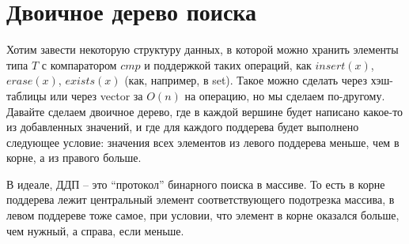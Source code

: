 \section{Двоичное дерево поиска}



Хотим завести некоторую структуру данных, в которой можно хранить элементы типа $T$ с компаратором $cmp$ и поддержкой таких операций, как $insert(x)$, $erase(x)$, $exists(x)$ (как, например, в set). Такое можно сделать через хэш-таблицы или через vector за $O(n)$ на операцию, но мы сделаем по-другому. 
Давайте сделаем двоичное дерево, где в каждой вершине будет написано какое-то из добавленных значений, и где для каждого поддерева будет выполнено следующее условие: значения всех элементов из левого поддерева меньше, чем в корне, а из правого больше. \\ 

\begin{center} 
\end{center}

В идеале, ДДП -- это ``протокол'' бинарного поиска в массиве. То есть в корне поддерева лежит центральный элемент соответствующего подотрезка массива, в левом поддереве тоже самое, при условии, что элемент в корне оказался больше, чем нужный, а справа, если меньше. \\

